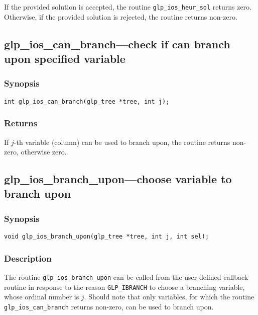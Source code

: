 If the provided solution is accepted, the routine
\verb|glp_ios_heur_sol| returns zero. Otherwise, if the provided
solution is rejected, the routine returns non-zero.

\subsection{glp\_ios\_can\_branch---check if can branch upon specified
variable}

\subsubsection*{Synopsis}

\begin{verbatim}
int glp_ios_can_branch(glp_tree *tree, int j);
\end{verbatim}

\subsubsection*{Returns}

If $j$-th variable (column) can be used to branch upon, the routine
returns non-zero, otherwise zero.

\newpage

\subsection{glp\_ios\_branch\_upon---choose variable to branch upon}

\subsubsection*{Synopsis}

\begin{verbatim}
void glp_ios_branch_upon(glp_tree *tree, int j, int sel);
\end{verbatim}

\subsubsection*{Description}

The routine \verb|glp_ios_branch_upon| can be called from the
user-defined callback routine in response to the reason
\verb|GLP_IBRANCH| to choose a branching variable, whose ordinal number
is $j$. Should note that only variables, for which the routine
\verb|glp_ios_can_branch| returns non-zero, can be used to branch upon.

